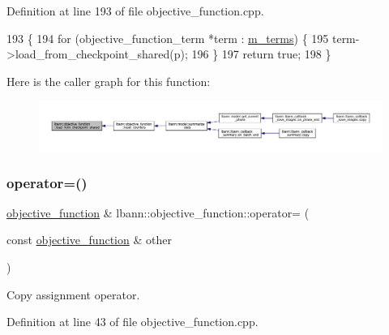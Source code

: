 Definition at line 193 of file objective\+\_\+function.\+cpp.


\begin{DoxyCode}
193                                                                     \{
194   \textcolor{keywordflow}{for} (objective\_function\_term *term : \hyperlink{classlbann_1_1objective__function_aea9c1f90ba9af1b1330efa2ba6adb5e2}{m\_terms}) \{
195     term->load\_from\_checkpoint\_shared(p);
196   \}
197   \textcolor{keywordflow}{return} \textcolor{keyword}{true};
198 \}
\end{DoxyCode}
Here is the caller graph for this function\+:\nopagebreak
\begin{figure}[H]
\begin{center}
\leavevmode
\includegraphics[width=350pt]{classlbann_1_1objective__function_a82fec97efbb8c4f68a674d42e0f2faa4_icgraph}
\end{center}
\end{figure}
\mbox{\label{classlbann_1_1objective__function_ab0695b92af6dec63912e5ef0cb81b953}} 
\subsubsection{\texorpdfstring{operator=()}{operator=()}}
{\footnotesize\ttfamily \hyperlink{classlbann_1_1objective__function}{objective\+\_\+function} \& lbann\+::objective\+\_\+function\+::operator= (\begin{DoxyParamCaption}\item[{const \hyperlink{classlbann_1_1objective__function}{objective\+\_\+function} \&}]{other }\end{DoxyParamCaption})}

Copy assignment operator. 

Definition at line 43 of file objective\+\_\+function.\+cpp.


